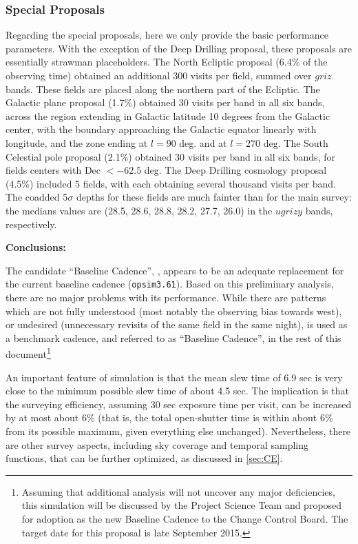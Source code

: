 \subsubsection{Special Proposals}

Regarding the special proposals, here we only provide the basic
performance parameters. With the exception of the Deep Drilling
proposal, these proposals are essentially strawman placeholders. The
North Ecliptic proposal (6.4\% of the observing time) obtained an
additional 300 visits per field, summed over $griz$ bands. These
fields are placed along the northern part of the Ecliptic. The
Galactic plane proposal (1.7\%) obtained 30 visits per band in all six
bands, across the region extending in Galactic latitude 10 degrees
from the Galactic center, with the boundary approaching the Galactic
equator linearly with longitude, and the zone ending at $l=90$ deg.
and at $l=270$ deg. The South Celestial pole proposal (2.1\%) obtained
30 visits per band in all six bands, for fields centers with Dec $<
-62.5$ deg. The Deep Drilling cosmology proposal (4.5\%) included 5
fields, with each obtaining several thousand visits per band. The
coadded $5\sigma$ depths for these fields are much fainter than for
the main survey: the medians values are (28.5, 28.6, 28.8, 28.2, 27.7,
26.0) in the $ugrizy$ bands, respectively.


\vskip 0.2in
{\bf Conclusions:}

The candidate “Baseline Cadence”, , appears to
be an adequate replacement for the current baseline cadence
(\texttt{opsim3.61}). Based on this preliminary analysis, there are no
major problems with its performance. While there are patterns which
are not fully understood (most notably the observing bias towards
west),  or undesired (unnecessary revisits of the same field in the
same night),  is used as a benchmark cadence,
and referred to as ``Baseline Cadence'',  in the rest of this
document\footnote{Assuming that additional analysis will not uncover
any major deficiencies, this simulation will be discussed by the
Project Science Team and proposed for adoption as the new Baseline
Cadence to the Change Control Board. The target date for this proposal
is late September 2015.}

An important feature of  simulation is that the
mean slew time of 6.9 sec is very close to the minimum possible slew
time of about 4.5 sec. The implication is that the surveying
efficiency, assuming 30 sec exposure time per visit, can be increased
by at most about 6\% (that is, the total open-shutter time is within
about 6\% from its possible maximum, given everything else unchanged).
Nevertheless, there are other survey aspects, including sky coverage
and temporal sampling functions, that can be further optimized, as
discussed in \autoref{sec:CE}.

